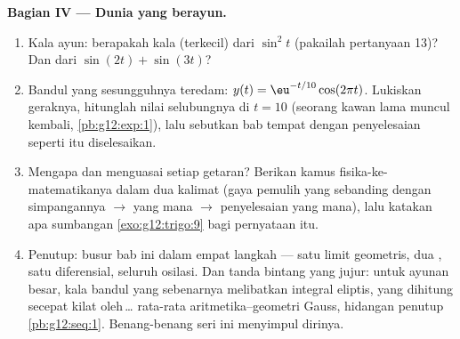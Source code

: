 \begin{problem}
\medskip
\noindent\textbf{Bagian IV --- Dunia yang berayun.}
\begin{enumerate}[resume]
  \item Kala ayun: berapakah kala (terkecil) dari
        $\sin^2 t$ (pakailah pertanyaan 13)? Dan dari
        $\sin(2t) + \sin(3t)$?
  \item Bandul yang sesungguhnya teredam:
        $y(t) = \eu^{-t/10}\cos(2\pi t)$. Lukiskan geraknya,
        hitunglah nilai selubungnya di $t = 10$ (seorang kawan lama
        muncul kembali, \cref{pb:g12:exp:1}), lalu sebutkan bab
        tempat  dengan penyelesaian seperti itu diselesaikan.
  \item Mengapa  dan  menguasai setiap getaran? Berikan
        kamus fisika-ke-matematikanya dalam dua kalimat
        (gaya pemulih yang sebanding dengan simpangannya
        $\rightarrow$  yang mana $\rightarrow$ penyelesaian
        yang mana), lalu katakan apa sumbangan \cref{exo:g12:trigo:9}
        bagi pernyataan itu.
  \item Penutup: busur bab ini dalam empat langkah --- satu
        limit geometris, dua , satu 
        diferensial, seluruh osilasi. Dan tanda bintang yang jujur:
        untuk ayunan besar, kala bandul yang sebenarnya melibatkan
        integral eliptis, yang dihitung secepat kilat oleh\,\dots
        rata-rata aritmetika--geometri Gauss, hidangan penutup
        \cref{pb:g12:seq:1}. Benang-benang seri ini menyimpul dirinya.

\end{enumerate}
\end{problem}
